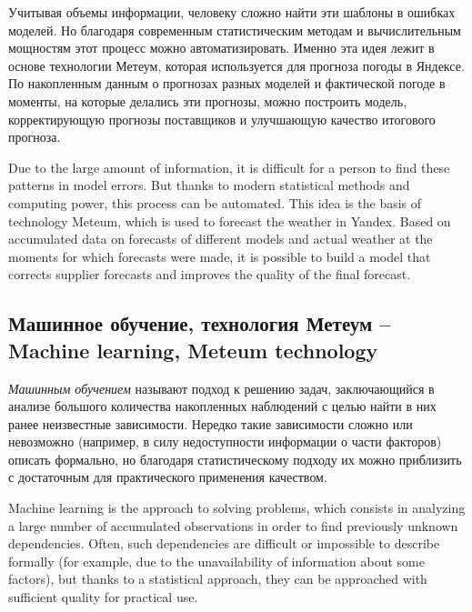 \documentclass[14pt]{matmex-diploma}
\begin{document}
Учитывая объемы информации, человеку сложно найти эти шаблоны в ошибках моделей. Но благодаря современным статистическим методам и вычислительным мощностям этот процесс можно автоматизировать. Именно эта идея лежит в основе технологии Метеум, которая используется для прогноза погоды в Яндексе. По накопленным данным о прогнозах разных моделей и фактической погоде в моменты, на которые делались эти прогнозы, можно построить модель, корректирующую прогнозы поставщиков и улучшающую качество итогового прогноза.

Due to the large amount of information, it is difficult for a person to find these patterns in model errors. But thanks to modern statistical methods and computing power, this process can be automated. This idea is the basis of technology Meteum, which is used to forecast the weather in Yandex. Based on accumulated data on forecasts of different models and actual weather at the moments for which forecasts were made, it is possible to build a model that corrects supplier forecasts and improves the quality of the final forecast.


\subsection{Машинное обучение, технология Метеум -- Machine learning, Meteum technology}

\textit{Машинным обучением} называют подход к решению задач, заключающийся в анализе большого количества накопленных наблюдений с целью найти в них ранее неизвестные зависимости. Нередко такие зависимости сложно или невозможно (например, в силу недоступности информации о части факторов) описать формально, но благодаря статистическому подходу их можно приблизить с достаточным для практического применения качеством\cite{bishop}.

Machine learning is the approach to solving problems, which consists in analyzing a large number of accumulated observations in order to find previously unknown dependencies. Often, such dependencies are difficult or impossible to describe formally (for example, due to the unavailability of information about some factors), but thanks to a statistical approach, they can be approached with sufficient quality for practical use\cite{bishop}.
\end{document}
